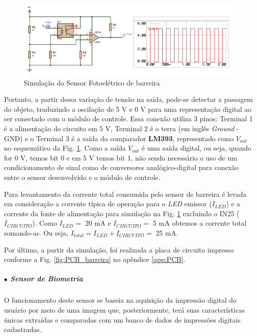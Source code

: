     \begin{figure}[H]
    \centering
    \includegraphics[scale=0.65]{figuras/eletronica/esquematicos/sensor_barreira/Sim_sensor_barreir_3.PDF}
    \caption{Simulação do Sensor Fotoelétrico de barreira}
    \label{fig:sim_sensor_barreira}
    \end{figure}
    
     Portanto, a partir dessa variação de tensão na saída, pode-se detectar a passagem do objeto, traduzindo a oscilação de 5 V e 0 V para uma representação digital ao ser conectado com o módulo de controle. Essa conexão utiliza 3 pinos: Terminal 1 é a alimentação do circuito em 5 V, Terminal 2 é o terra (em inglês \textit{Ground} - GND) e o Terminal 3 é a saída do comparador \textbf{LM393}, representado como $V_{out}$ no esquemático da Fig. \ref{fig:sim_sensor_barreira}. Como a saída $V_{out}$ é uma saída digital, ou seja, quando for 0 V, temos {bit} 0 e em 5 V temos {bit} 1, não sendo necessário o uso de um condicionamento de sinal como de conversores analógico-digital para conexão entre o sensor desenvolvido e o módulo de controle.

    Para levantamento da corrente total consumida pelo sensor de barreira é levada em consideração a corrente típica de operação para o \textit{LED} emissor ($I_{LED}$) e a corrente da fonte de alimentação para simulação na Fig. \ref{fig:sim_sensor_barreira} excluindo o IN25 ($I_{CIRCUITO}$). Como $I_{LED} =$ 20 mA e $I_{CIRCUITO} =$ 5 mA  obtemos a corrente total somando-as. Ou seja, $I_{total} = I_{LED} + I_{CIRCUITO} =$ 25 mA.  
    
    Por último, a partir da simulação, foi realizada a placa de circuito impresso conforme a Fig. \ref{fig:PCB_barreira} no apêndice \ref{app:PCB}.  

    \subparagraph*{$\bullet$ Sensor de Biometria} \hfill
    
    O funcionamento deste sensor se baseia na aquisição da impressão digital do usuário por meio de uma imagem que, posteriormente, terá suas características únicas extraídas e comparadas com um banco de dados de impressões digitais cadastradas. 
    
